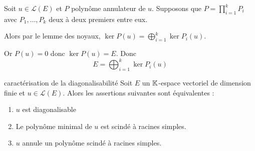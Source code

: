 \begin{corollaire}{}{}
    Soit $u \in \mathscr L(E)$ et $P$ polynôme annulateur de $u$. Supposons que 
    $P = \displaystyle \prod_{i = 1}^{ k } P_i$ avec $P_1, \ldots, P_k$ deux à deux premiers entre eux.

    Alors par le lemme des noyaux, $\ker P(u) = \bigoplus_{i = 1 }^{ k } \ker P_i(u)$.

    Or $P(u) = 0$ donc $\ker P(u) = E$. Donc 
    $$E = \bigoplus_{i = 1 }^{ k } \ker P_i(u)$$
\end{corollaire}

\begin{theoreme}{caractérisation de la diagonalisabilité}{}
    Soit $E$ un $\mathbb{K}$-espace vectoriel de dimension finie et $u \in \mathscr L(E)$. 
    Alors les assertions suivantes sont équivalentes :
    \begin{enumerate}
        \item $u$ est diagonalisable
        \item Le polynôme minimal de $u$ est scindé à racines simples.
        \item $u$ annule un polynôme scindé à racines simples.
    \end{enumerate}
\end{theoreme}

